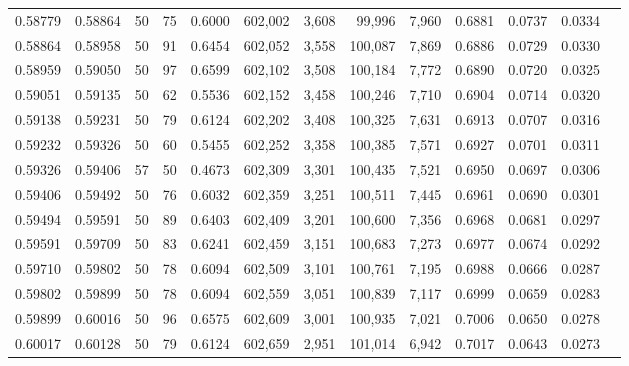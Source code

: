 \begin{tabular}{rrrrrrrrrrrrr}
0.58779 & 0.58864 &    50 &  75 &                                     0.6000 & 602,002 &   3,608 &  99,996 &   7,960 & 0.6881 & 0.0737 & 0.0334 \\
0.58864 & 0.58958 &    50 &  91 &                                     0.6454 & 602,052 &   3,558 & 100,087 &   7,869 & 0.6886 & 0.0729 & 0.0330 \\
0.58959 & 0.59050 &    50 &  97 &                                     0.6599 & 602,102 &   3,508 & 100,184 &   7,772 & 0.6890 & 0.0720 & 0.0325 \\
0.59051 & 0.59135 &    50 &  62 &                                     0.5536 & 602,152 &   3,458 & 100,246 &   7,710 & 0.6904 & 0.0714 & 0.0320 \\
0.59138 & 0.59231 &    50 &  79 &                                     0.6124 & 602,202 &   3,408 & 100,325 &   7,631 & 0.6913 & 0.0707 & 0.0316 \\
0.59232 & 0.59326 &    50 &  60 &                                     0.5455 & 602,252 &   3,358 & 100,385 &   7,571 & 0.6927 & 0.0701 & 0.0311 \\
0.59326 & 0.59406 &    57 &  50 &                                     0.4673 & 602,309 &   3,301 & 100,435 &   7,521 & 0.6950 & 0.0697 & 0.0306 \\
0.59406 & 0.59492 &    50 &  76 &                                     0.6032 & 602,359 &   3,251 & 100,511 &   7,445 & 0.6961 & 0.0690 & 0.0301 \\
0.59494 & 0.59591 &    50 &  89 &                                     0.6403 & 602,409 &   3,201 & 100,600 &   7,356 & 0.6968 & 0.0681 & 0.0297 \\
0.59591 & 0.59709 &    50 &  83 &                                     0.6241 & 602,459 &   3,151 & 100,683 &   7,273 & 0.6977 & 0.0674 & 0.0292 \\
0.59710 & 0.59802 &    50 &  78 &                                     0.6094 & 602,509 &   3,101 & 100,761 &   7,195 & 0.6988 & 0.0666 & 0.0287 \\
0.59802 & 0.59899 &    50 &  78 &                                     0.6094 & 602,559 &   3,051 & 100,839 &   7,117 & 0.6999 & 0.0659 & 0.0283 \\
0.59899 & 0.60016 &    50 &  96 &                                     0.6575 & 602,609 &   3,001 & 100,935 &   7,021 & 0.7006 & 0.0650 & 0.0278 \\
0.60017 & 0.60128 &    50 &  79 &                                     0.6124 & 602,659 &   2,951 & 101,014 &   6,942 & 0.7017 & 0.0643 & 0.0273 \\

\end{tabular}
